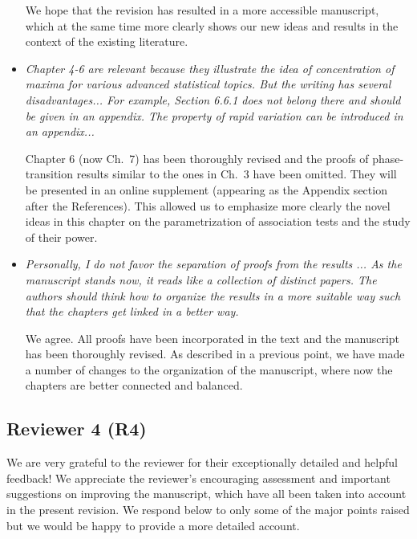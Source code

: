 \documentclass[11pt]{article}
\begin{document}
\begin{itemize}
     We hope that the revision has resulted in a more accessible manuscript, which at the same time more clearly shows our new ideas and results in the
     context of the existing literature.
     
     \item {\em Chapter 4-6 are relevant because they illustrate the idea of concentration of maxima for various advanced statistical topics. But the writing has several disadvantages... For example, Section 6.6.1 does not belong there and should be given in an appendix. The property of rapid variation can be introduced in an appendix...}
     
     Chapter 6 (now Ch.\ 7) has been thoroughly revised and the proofs of phase-transition results similar to the ones in Ch.\ 3 have been omitted.  They
     will be presented in an online supplement (appearing as the Appendix section after the References).  This 
     allowed us to emphasize more clearly the novel ideas in this chapter on the parametrization of association tests and the study of their power.  
     
         
     \item {\em Personally, I do not favor the separation of proofs from the results ... As the manuscript stands now, it reads like a collection of distinct papers. 
     The authors should think how to organize the results in a more suitable way such that the chapters get linked in a better way.}
     
     We agree.  All proofs have been incorporated in the text and the manuscript has been thoroughly revised.  As described in a previous point, we have
     made a number of changes to the organization of the manuscript, where now the chapters are better connected and balanced.
     
     
   \end{itemize}
   
   \subsection{Reviewer 4 (R4)}
   
   We are very grateful to the reviewer for their exceptionally detailed and helpful feedback!  We appreciate the reviewer's encouraging assessment and 
   important suggestions on improving the manuscript, which have all been taken into account in the present revision.  We respond below to only some
   of the major points raised but we would be happy to provide a more detailed account.
  
\end{document}
